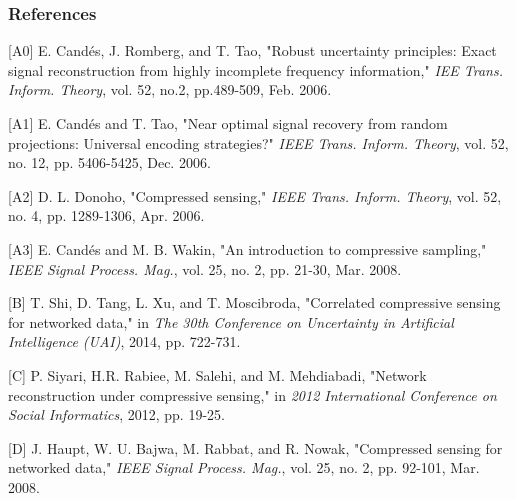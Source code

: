 \documentclass{article} %
\begin{document}
\subsubsection*{References}
\small{



[A0] E. Cand\'{e}s, J. Romberg, and T. Tao, "Robust uncertainty principles: Exact signal reconstruction from highly incomplete frequency information," {\it IEE Trans. Inform. Theory}, vol. 52, no.2, pp.489-509, Feb. 2006.

[A1] E. Cand\'{e}s and T. Tao, "Near optimal signal recovery from random projections: Universal encoding strategies?" {\it IEEE Trans. Inform. Theory}, vol. 52, no. 12, pp. 5406-5425, Dec. 2006.

[A2] D. L. Donoho, "Compressed sensing," {\it IEEE Trans. Inform. Theory}, vol. 52, no. 4, pp. 1289-1306, Apr. 2006.

[A3] E. Cand\'{e}s and M. B. Wakin, "An introduction to compressive sampling," {\it IEEE Signal Process. Mag.}, vol. 25, no. 2, pp. 21-30, Mar. 2008.



[B] T. Shi, D. Tang, L. Xu, and T. Moscibroda, "Correlated compressive sensing for networked data," in {\it The 30th Conference on Uncertainty in Artificial Intelligence (UAI)}, 2014, pp. 722-731.

[C] P. Siyari, H.R. Rabiee, M. Salehi, and M. Mehdiabadi, "Network reconstruction under compressive sensing," in {\it 2012 International Conference on Social Informatics}, 2012, pp. 19-25.

[D] J. Haupt, W. U. Bajwa, M. Rabbat, and R. Nowak, "Compressed sensing for networked data," {\it IEEE Signal Process. Mag.}, vol. 25, no. 2, pp. 92-101, Mar. 2008.

}
\end{document}
